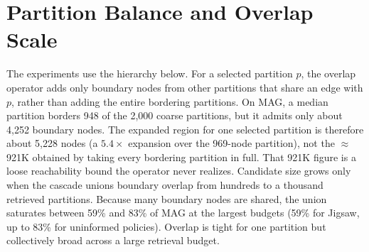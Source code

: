 \documentclass{article}
\begin{document}
\section{Partition Balance and Overlap Scale}
\label{app:partitions}

The experiments use the hierarchy below. For a selected partition $p$, the overlap operator adds only boundary nodes from other partitions that share an edge with $p$, rather than adding the entire bordering partitions. On MAG, a median partition borders 948 of the 2{,}000 coarse partitions, but it admits only about 4{,}252 boundary nodes. The expanded region for one selected partition is therefore about 5{,}228 nodes (a $5.4\times$ expansion over the 969-node partition), not the $\approx$921K obtained by taking every bordering partition in full. That 921K figure is a loose reachability bound the operator never realizes. Candidate size grows only when the cascade unions boundary overlap from hundreds to a thousand retrieved partitions. Because many boundary nodes are shared, the union saturates between 59\% and 83\% of MAG at the largest budgets (59\% for Jigsaw, up to 83\% for uninformed policies). Overlap is tight for one partition but collectively broad across a large retrieval budget.

\begin{table}[h]
\centering
\caption{\textbf{Partition balance.} Coarse partitions are ranked by retrieval; fine partitions support local overlap and bridge construction. Node counts are per partition.}
\label{tab:partition_sizes}
\scriptsize
\resizebox{\textwidth}{!}{}
\end{table}

\begin{table}[h]
\centering
\caption{\textbf{Overlap expansion scale.} ``+Boundary overlap'' is the median number of boundary nodes the operator actually admits for one selected partition; ``Expanded part'' is partition plus boundary overlap (with the multiple over the bare partition). ``Neighbor parts'' counts the partitions a part borders. ``Loose union bound'' is the median size obtained by taking every bordering partition in full. It is a reachability bound the operator never realizes. The realized per-partition overlap is small ($5.4\times$ on MAG); breadth arises only from unioning over the retrieval budget.}
\label{tab:partition_overlap}
\footnotesize
\resizebox{\textwidth}{!}{}
\end{table}
\end{document}
